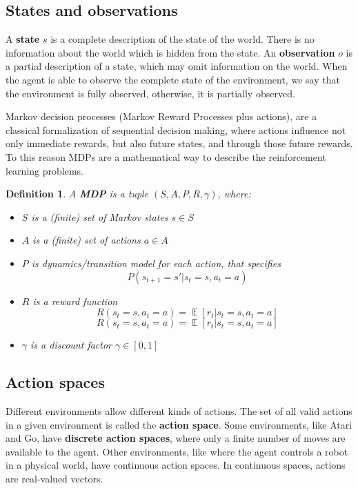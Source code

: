 \documentclass{article}
\newtheorem{definition}{Definition}
\DeclareMathOperator*{\E}{\mathbb{E}}
\begin{document}
\subsection{States and observations}
A \textbf{state} $s$ is a complete description of the state of the world. There is no information about the world which is hidden from the state. An \textbf{observation} $o$ is a partial description of a state, which may omit information on the world. When the agent is able to observe the complete state of the environment, we say that the environment is fully observed, otherwise, it is partially observed.

Markov decision processes (Markov Reward Processes plus actions), are a classical formalization of sequential decision making, where actions influence not only immediate rewards, but also future states, and through those future rewards. To this reason MDPs are a mathematical way to describe the reinforcement learning problems. 

\begin{definition}
	A \textbf{MDP} is a tuple $(S,A, P, R, \gamma)$, where:
	\begin{itemize}
		\item $S$ is a (finite) set of Markov states $s \in S$
		\item $A$ is a (finite) set of actions $a \in A$
		\item $P$ is dynamics/transition model for each action, that specifies
		\begin{equation}
			P(s_{t+1} =s'|s_t =s,a_t =a)	
		\end{equation}
		\item $R$ is a reward function
		\begin{equation}
			R(s_t =s,a_t =a)=\E[r_t|s_t =s,a_t =a]	
		\end{equation}
		$$R(s_t =s,a_t =a)=\E[r_t|s_t =s,a_t =a]$$
		\item $\gamma$ is a discount factor $\gamma \in [0,1]$
	\end{itemize}
\end{definition}


\subsection{Action spaces}
Different environments allow different kinds of actions. The set of all valid actions in a given environment is called the \textbf{action space}. Some environments, like Atari and Go, have \textbf{discrete action spaces}, where only a finite number of moves are available to the agent. Other environments, like where the agent controls a robot in a physical world, have continuous action spaces. In continuous spaces, actions are real-valued vectors.
\end{document}
